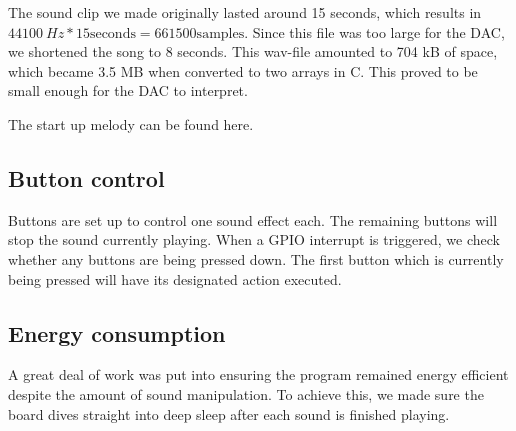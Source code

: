 The sound clip we made originally lasted around 15 seconds, which results in $\SI{44100}{Hz} * 15 \text{seconds} = 661500 \text{samples}$.
Since this file was too large for the DAC, we shortened the song to 8 seconds.
This wav-file amounted to 704 kB of space, which became 3.5 MB when converted to two arrays in C. This proved to be small enough for the DAC to interpret.

The start up melody can be found here. \cite{song}

\subsection{Button control}

Buttons are set up to control one sound effect each. The remaining buttons will stop the sound currently playing.
When a GPIO interrupt is triggered, we check whether any buttons are being pressed down.
The first button which is currently being pressed will have its designated action executed.

\subsection{Energy consumption}

A great deal of work was put into ensuring the program remained energy efficient despite the amount of sound manipulation.
To achieve this, we made sure the board dives straight into deep sleep after each sound is finished playing.
